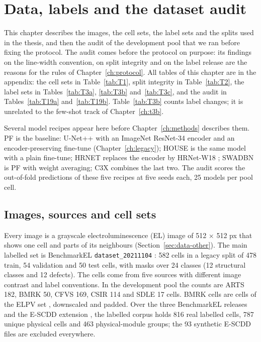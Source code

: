 \chapter{Data, labels and the dataset audit}\label{ch:data}

This chapter describes the images, the cell sets, the label sets and the splits used in the thesis, and then the audit of the
development pool that we ran before fixing the protocol. The audit comes before the protocol on purpose: its findings on the
line-width convention, on split integrity and on the label release are the reasons for the rules of Chapter~\ref{ch:protocol}.
All tables of this chapter are in the appendix: the cell sets in Table~\ref{tab:T1}, split integrity in Table~\ref{tab:T2}, the
label sets in Tables~\ref{tab:T3a}, \ref{tab:T3b} and~\ref{tab:T3c}, and the audit in Tables~\ref{tab:T19a} and~\ref{tab:T19b}.
Table~\ref{tab:T3b} counts label changes; it is unrelated to the few-shot track of Chapter~\ref{ch:t3b}.

Several model recipes appear here before Chapter~\ref{ch:methods} describes them. PF is the baseline: U-Net++
\citep{zhou2018unetpp} with an ImageNet ResNet-34 encoder and an encoder-preserving fine-tune (Chapter~\ref{ch:legacy}); HOUSE is
the same model with a plain fine-tune; HRNET replaces the encoder by HRNet-W18 \citep{wang2021hrnet}; SWADBN is PF with weight
averaging; C3X combines the last two. The audit scores the out-of-fold predictions of these five recipes at five seeds each, 25
models per pool cell.

\section{Images, sources and cell sets}\label{sec:data-sets}

Every image is a grayscale electroluminescence (EL) image of 512 $\times$ 512 px that shows one cell and parts of its neighbours
(Section~\ref{sec:data-other}). The main labelled set is BenchmarkEL \texttt{dataset\_20211104} \citep{pratt2023benchmark}: 582 cells
in a legacy split of 478 train, 54 validation and 50 test cells, with masks over 24 classes (12 structural classes and 12 defects).
The cells come from five sources with different image contrast and label conventions. In the development pool the counts are
ARTS 182, BMRK 50, CFVS 169, CSIR 114 and SDLE 17 cells. BMRK cells are cells of the ELPV set \citep{deitsch2019elpv}, downscaled and
padded. Over the three BenchmarkEL releases and the E-SCDD extension \citep{hanifi2025escdd}, the labelled corpus holds 816 real
labelled cells, 787 unique physical cells and 463 physical-module groups; the 93 synthetic E-SCDD files are excluded everywhere.

